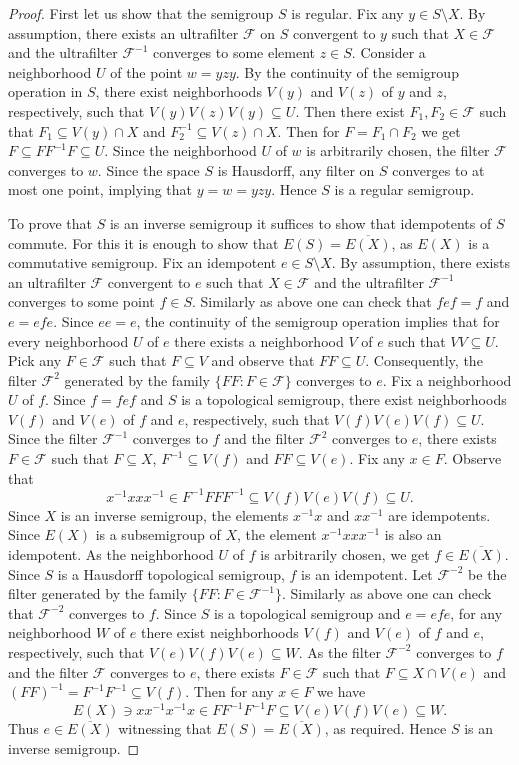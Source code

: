 \documentclass[12pt, twoside, leqno]{article}
\theoremstyle{definition}
\numberwithin{equation}{section}
\newcommand{\F}{\mathcal F}
\begin{document}
\begin{proof}
First let us show that the semigroup $S$ is regular. Fix any $y\in S\setminus X$. By assumption, there exists an ultrafilter $\F$ on $S$ convergent to $y$ such that $X\in\F$ and the ultrafilter $\F^{-1}$ converges to some element $z\in S$. Consider a neighborhood $U$ of the point $w=yzy$. By the continuity of the semigroup operation in $S$, there exist neighborhoods $V(y)$ and $V(z)$ of $y$ and $z$, respectively, such that $V(y)V(z)V(y)\subseteq U$. Then there exist $F_1, F_2\in \F$ such that $F_1\subseteq V(y)\cap X$ and $F_2^{-1}\subseteq V(z)\cap X$. Then for $F=F_1\cap F_2$ we get $F\subseteq FF^{-1}F\subseteq U$. Since the neighborhood $U$ of $w$ is arbitrarily chosen, the filter $\F$ converges to $w$. Since the space $S$ is Hausdorff, any filter on $S$ converges to at most one point, implying that $y=w=yzy$. Hence $S$ is a regular semigroup.  

To prove that $S$ is an inverse semigroup it suffices to show that idempotents of $S$ commute. For this it is enough to show that $E(S)=\overline{E(X)}$, as $E(X)$ is a commutative semigroup. Fix an idempotent $e\in S\setminus X$. By assumption, there exists an ultrafilter $\F$ convergent to $e$ such that $X\in \F$ and the ultrafilter $\F^{-1}$ converges to some point $f\in S$.
Similarly as above one can check that $fef=f$ and $e=efe$.
Since $ee=e$, the continuity of the semigroup operation implies that for every neighborhood $U$ of $e$ there exists a neighborhood $V$ of $e$ such that $VV\subseteq U$. Pick any $F\in\F$  such that $F\subseteq V$ and observe that $FF\subseteq U$. 
Consequently, the filter $\F^2$ generated by the family $\{FF: F\in\F\}$ converges to $e$. 
Fix a neighborhood $U$ of $f$. Since $f=fef$ and $S$ is a topological semigroup, there exist neighborhoods $V(f)$ and $V(e)$ of $f$ and $e$, respectively, such that $V(f)V(e)V(f)\subseteq U$. Since the filter $\F^{-1}$ converges to $f$ and the filter $\F^2$ converges to $e$, there exists $F\in \F$ such that $F\subseteq X$, $F^{-1}\subseteq V(f)$ and $FF\subseteq V(e)$. Fix any $x\in F$. Observe that  $$x^{-1}xxx^{-1}\in F^{-1}FFF^{-1}\subseteq V(f)V(e)V(f)\subseteq U.$$ 
Since $X$ is an inverse semigroup, the elements $x^{-1}x$ and $xx^{-1}$ are idempotents. Since $E(X)$ is a subsemigroup of $X$, the element $x^{-1}xxx^{-1}$ is also an idempotent. As the neighborhood $U$ of $f$ is arbitrarily chosen, we get $f\in \overline{E(X)}$. Since $S$ is a Hausdorff topological semigroup, $f$ is an idempotent. Let $\F^{-2}$ be the filter generated by the family $\{FF: F\in \F^{-1}\}$. Similarly as above one can check that $\F^{-2}$ converges to $f$. Since $S$ is a topological semigroup and $e=efe$, for any neighborhood $W$ of $e$ there exist neighborhoods $V(f)$ and $V(e)$ of $f$ and $e$, respectively, such that $V(e)V(f)V(e)\subseteq W$. As the filter $\F^{-2}$ converges to $f$ and the filter $\F$ converges to $e$, there exists $F\in \F$ such that $F\subseteq X\cap V(e)$ and $(FF)^{-1}=F^{-1}F^{-1}\subseteq V(f)$. Then for any $x\in F$ we have $$E(X)\ni xx^{-1}x^{-1}x\in FF^{-1}F^{-1}F\subseteq V(e)V(f)V(e)\subseteq W.$$
Thus $e\in \overline{E(X)}$ witnessing that $E(S)=\overline{E(X)}$, as required. Hence $S$ is an inverse semigroup.
\end{proof}
\end{document}
